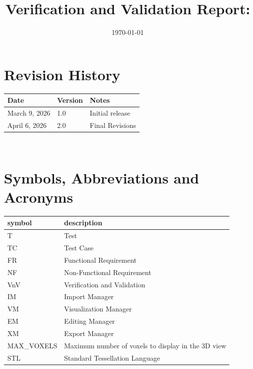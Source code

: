 \documentclass[12pt, titlepage]{article}
\begin{document}
\title{Verification and Validation Report: \progname} 
\author{\authname}
\date{\today}
	
\maketitle


\section{Revision History}

\begin{tabularx}{\textwidth}{p{3cm}p{2cm}X}
\toprule {\bf Date} & {\bf Version} & {\bf Notes}\\
\midrule
March 9, 2026 & 1.0 & Initial release\\
April 6, 2026 & 2.0 & Final Revisions\\
\bottomrule
\end{tabularx}

~\newpage

\section{Symbols, Abbreviations and Acronyms}

\renewcommand{\arraystretch}{1.2}
\begin{tabular}{l l} 
  \toprule		
  \textbf{symbol} & \textbf{description}\\
  \midrule 
  T & Test\\
  TC & Test Case\\
  FR & Functional Requirement\\
  NF & Non-Functional Requirement\\
  VnV & Verification and Validation\\
  IM & Import Manager\\
  VM & Visualization Manager\\
  EM & Editing Manager\\
  XM & Export Manager\\
  MAX\_VOXELS & Maximum number of voxels to display in the 3D view\\
  STL & Standard Tessellation Language\\
  \bottomrule
\end{tabular}\\

\newpage
\end{document}

